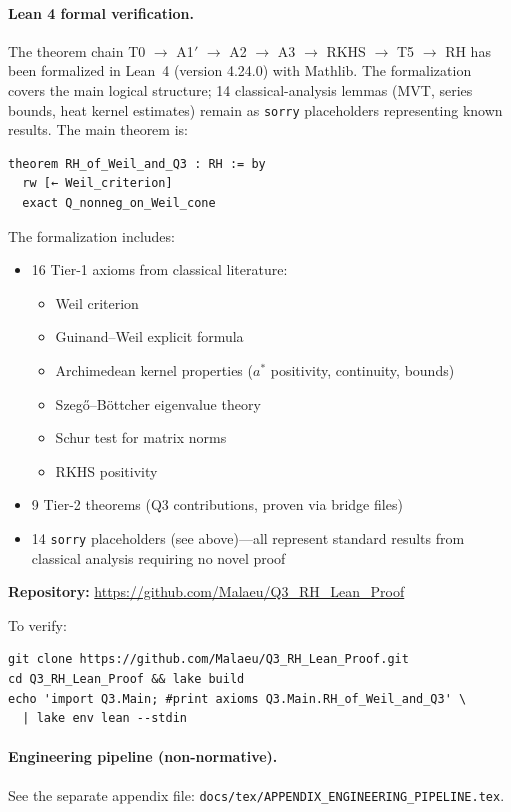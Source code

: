 \paragraph{Lean 4 formal verification.}
The theorem chain T0 $\to$ A1$'$ $\to$ A2 $\to$ A3 $\to$ RKHS $\to$ T5 $\to$ RH has been formalized in Lean~4 (version 4.24.0) with Mathlib. The formalization covers the main logical structure; 14 classical-analysis lemmas (MVT, series bounds, heat kernel estimates) remain as \texttt{sorry} placeholders representing known results. The main theorem is:
\begin{verbatim}
theorem RH_of_Weil_and_Q3 : RH := by
  rw [← Weil_criterion]
  exact Q_nonneg_on_Weil_cone
\end{verbatim}
The formalization includes:
\begin{itemize}
  \item 16 Tier-1 axioms from classical literature:
    \begin{itemize}
      \item Weil criterion \cite{Weil1952}
      \item Guinand--Weil explicit formula \cite{Guinand1948}
      \item Archimedean kernel properties ($a^*$ positivity, continuity, bounds) \cite{Titchmarsh1986}
      \item Szeg\H{o}--B\"ottcher eigenvalue theory \cite{GrenanderSzego1958,BoettcherSilbermann1990}
      \item Schur test for matrix norms \cite{Schur1911}
      \item RKHS positivity \cite{Aronszajn1950}
    \end{itemize}
  \item 9 Tier-2 theorems (Q3 contributions, proven via bridge files)
  \item 14 \texttt{sorry} placeholders (see above)---all represent standard results from classical analysis requiring no novel proof
\end{itemize}
\textbf{Repository:} \url{https://github.com/Malaeu/Q3_RH_Lean_Proof}

\noindent To verify:
\begin{verbatim}
git clone https://github.com/Malaeu/Q3_RH_Lean_Proof.git
cd Q3_RH_Lean_Proof && lake build
echo 'import Q3.Main; #print axioms Q3.Main.RH_of_Weil_and_Q3' \
  | lake env lean --stdin
\end{verbatim}

\paragraph{Engineering pipeline (non-normative).}
See the separate appendix file: \verb|docs/tex/APPENDIX_ENGINEERING_PIPELINE.tex|.
% 

\endgroup
